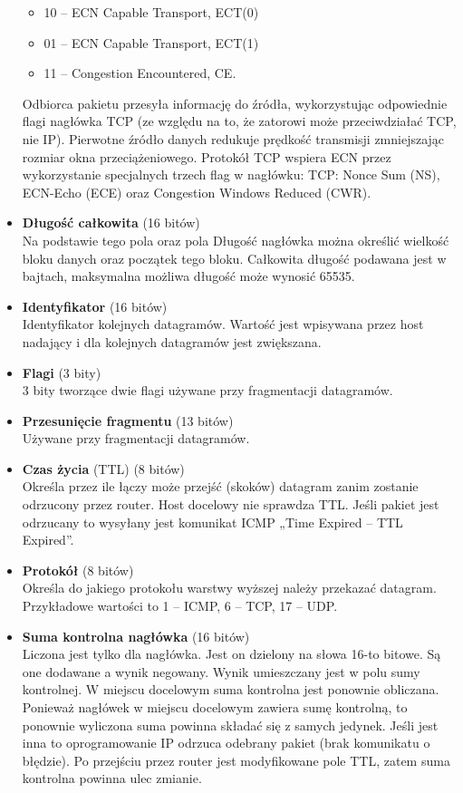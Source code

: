 \documentclass[a4paper]{article}
\begin{document}
\begin{itemize}
\begin{itemize}
        \item 10 – ECN Capable Transport, ECT(0)
        \item 01 – ECN Capable Transport, ECT(1)
        \item 11 – Congestion Encountered, CE.
    \end{itemize}
    Odbiorca pakietu przesyła informację do źródła, wykorzystując odpowiednie flagi nagłówka TCP (ze względu na to, że zatorowi może przeciwdziałać TCP, nie IP). Pierwotne źródło danych redukuje prędkość transmisji zmniejszając rozmiar okna przeciążeniowego. Protokół TCP wspiera ECN przez wykorzystanie specjalnych trzech flag w nagłówku: TCP: Nonce Sum (NS), ECN-Echo (ECE) oraz Congestion Windows Reduced (CWR).
    \item \textbf{Długość całkowita} (16 bitów)\\
    Na podstawie tego pola oraz pola Długość nagłówka można określić wielkość bloku danych oraz początek tego bloku. Całkowita długość podawana jest w bajtach, maksymalna możliwa długość może wynosić 65535.
    \item \textbf{Identyfikator} (16 bitów)\\
    Identyfikator kolejnych datagramów. Wartość jest wpisywana przez host nadający i dla kolejnych datagramów jest zwiększana.
    \item \textbf{Flagi} (3 bity)\\
    3 bity tworzące dwie flagi używane przy fragmentacji datagramów.
    \item \textbf{Przesunięcie fragmentu} (13 bitów)\\
    Używane przy fragmentacji datagramów.
    \item \textbf{Czas życia} (TTL) (8 bitów)\\
    Określa przez ile łączy może przejść (skoków) datagram zanim zostanie odrzucony przez router. Host docelowy nie sprawdza TTL. Jeśli pakiet jest odrzucany to wysyłany jest komunikat ICMP „Time Expired – TTL Expired”.
    \item \textbf{Protokół} (8 bitów)\\
    Określa do jakiego protokołu warstwy wyższej należy przekazać datagram. Przykładowe wartości to 1 – ICMP, 6 – TCP, 17 – UDP.
    \item \textbf{Suma kontrolna nagłówka} (16 bitów)\\
    Liczona jest tylko dla nagłówka. Jest on dzielony na słowa 16-to bitowe. Są one dodawane a wynik negowany. Wynik umieszczany jest w polu sumy kontrolnej. W miejscu docelowym suma kontrolna jest ponownie obliczana. Ponieważ nagłówek w miejscu docelowym zawiera sumę kontrolną, to ponownie wyliczona suma powinna składać się z samych jedynek. Jeśli jest inna to oprogramowanie IP odrzuca odebrany pakiet (brak komunikatu o błędzie). Po przejściu przez router jest modyfikowane pole TTL, zatem suma kontrolna powinna ulec zmianie.

\end{itemize}
\end{document}
